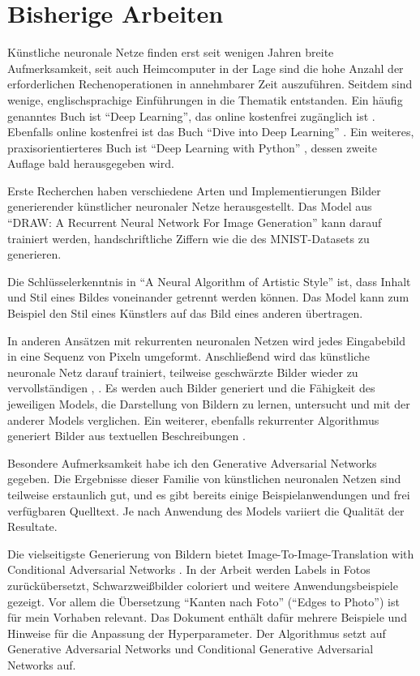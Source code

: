 \section{Bisherige Arbeiten}
\label{sec:related}
Künstliche neuronale Netze finden erst seit wenigen Jahren breite Aufmerksamkeit,
seit auch Heimcomputer in der Lage sind die hohe Anzahl der erforderlichen
Rechenoperationen in annehmbarer Zeit auszuführen. Seitdem sind wenige,
englischsprachige Einführungen in die Thematik entstanden. Ein häufig genanntes
Buch ist ``Deep Learning'', das online kostenfrei zugänglich ist \cite{goodfellow2016deeplearning}.
Ebenfalls online kostenfrei ist das Buch ``Dive into Deep Learning'' \cite{zhang2020dive}.
Ein weiteres, praxisorientierteres Buch ist ``Deep Learning with Python'' \cite{chollet2017dlpython}, dessen
zweite Auflage bald herausgegeben wird.

Erste Recherchen haben verschiedene Arten und Implementierungen Bilder generierender künstlicher neuronaler Netze herausgestellt. Das Model aus ``DRAW: A Recurrent Neural Network For Image Generation'' \cite{gregor2015draw} kann darauf trainiert werden, handschriftliche Ziffern wie die des MNIST-Datasets zu generieren.

Die Schlüsselerkenntnis in ``A Neural Algorithm of Artistic Style'' \cite{gatys2015nst} ist, dass Inhalt und Stil eines Bildes voneinander getrennt werden können. Das Model kann zum Beispiel den Stil eines Künstlers auf das Bild eines anderen übertragen.

In anderen Ansätzen mit rekurrenten neuronalen Netzen wird jedes Eingabebild in eine Sequenz von Pixeln umgeformt. Anschließend wird das künstliche neuronale Netz darauf trainiert, teilweise geschwärzte Bilder wieder zu vervollständigen \cite{chen2020generative}, \cite{oord2016pixel}. Es werden auch Bilder generiert und die Fähigkeit des jeweiligen Models, die Darstellung von Bildern zu lernen, untersucht und mit der anderer Models verglichen. Ein weiterer, ebenfalls rekurrenter Algorithmus generiert Bilder aus textuellen Beschreibungen \cite{ramesh2021zeroshot}.

Besondere Aufmerksamkeit habe ich den Generative Adversarial Networks \cite{goodfellow2014generative} gegeben. Die Ergebnisse dieser Familie von künstlichen neuronalen Netzen sind teilweise erstaunlich gut, und es gibt bereits einige Beispielanwendungen und frei verfügbaren Quelltext. Je nach Anwendung des Models variiert die Qualität der Resultate.

Die vielseitigste Generierung von Bildern bietet Image-To-Image-Translation with Conditional Adversarial Networks \cite{isola2018imagetoimage}. In der Arbeit werden Labels in Fotos zurückübersetzt, Schwarzweißbilder coloriert und weitere Anwendungsbeispiele gezeigt. Vor allem die Übersetzung ``Kanten nach Foto'' (``Edges to Photo'') ist für mein Vorhaben relevant. Das Dokument enthält dafür mehrere Beispiele und Hinweise für die Anpassung der Hyperparameter. Der Algorithmus setzt auf Generative Adversarial Networks \cite{goodfellow2014generative} und Conditional Generative Adversarial Networks \cite{mirza2014conditional} auf.

